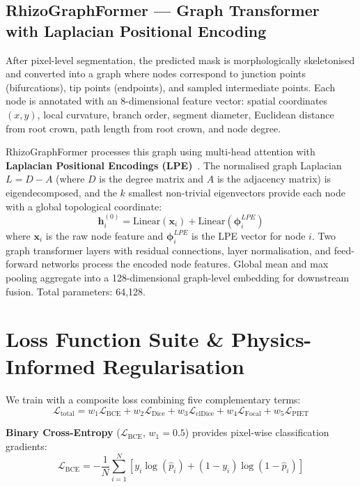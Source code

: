 \documentclass[final,3p,times,nonatbib]{elsarticle}
\begin{document}
\subsection{RhizoGraphFormer --- Graph Transformer with Laplacian Positional Encoding}
After pixel-level segmentation, the predicted mask is morphologically skeletonised and converted into a graph where nodes correspond to junction points (bifurcations), tip points (endpoints), and sampled intermediate points. Each node is annotated with an 8-dimensional feature vector: spatial coordinates $(x, y)$, local curvature, branch order, segment diameter, Euclidean distance from root crown, path length from root crown, and node degree.

RhizoGraphFormer processes this graph using multi-head attention with \textbf{Laplacian Positional Encodings (LPE)}~\cite{dwivedi2021generalization}. The normalised graph Laplacian $L = D - A$ (where $D$ is the degree matrix and $A$ is the adjacency matrix) is eigendecomposed, and the $k$ smallest non-trivial eigenvectors provide each node with a global topological coordinate:
\begin{equation}
    \mathbf{h}_i^{(0)} = \text{Linear}(\mathbf{x}_i) + \text{Linear}(\boldsymbol{\phi}_i^{LPE})
\end{equation}
where $\mathbf{x}_i$ is the raw node feature and $\boldsymbol{\phi}_i^{LPE}$ is the LPE vector for node $i$. Two graph transformer layers with residual connections, layer normalisation, and feed-forward networks process the encoded node features. Global mean and max pooling aggregate into a 128-dimensional graph-level embedding for downstream fusion. Total parameters: 64,128.


\section{Loss Function Suite \& Physics-Informed Regularisation}
\label{sec:loss}

We train with a composite loss combining five complementary terms:
\begin{equation}
    \mathcal{L}_{\text{total}} = w_1 \mathcal{L}_{\text{BCE}} + w_2 \mathcal{L}_{\text{Dice}} + w_3 \mathcal{L}_{\text{clDice}} + w_4 \mathcal{L}_{\text{Focal}} + w_5 \mathcal{L}_{\text{PIET}}
\end{equation}

\textbf{Binary Cross-Entropy} ($\mathcal{L}_{\text{BCE}}$, $w_1 = 0.5$) provides pixel-wise classification gradients:
\begin{equation}
    \mathcal{L}_{\text{BCE}} = -\frac{1}{N} \sum_{i=1}^{N} \left[ y_i \log(\hat{p}_i) + (1 - y_i) \log(1 - \hat{p}_i) \right]
\end{equation}
\end{document}
